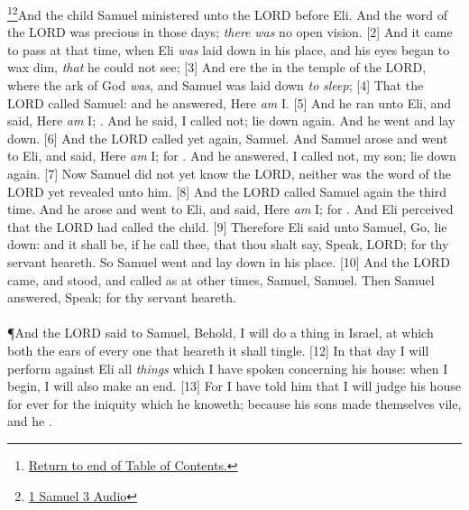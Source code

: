 \footnote{\textcolor[cmyk]{0.99998,1,0,0}{\hyperlink{TOC}{Return to end of Table of Contents.}}}\footnote{\href{https://audiobible.com/bible/1_samuel_3.html}{\textcolor[cmyk]{0.99998,1,0,0}{1 Samuel 3 Audio}}}\textcolor[cmyk]{0.99998,1,0,0}{And the child Samuel ministered unto the LORD before Eli. And the word of the LORD was precious in those days; \emph{there} \emph{was} no open vision.}
[2] \textcolor[cmyk]{0.99998,1,0,0}{And it came to pass at that time, when Eli \emph{was} laid down in his place, and his eyes began to wax dim, \emph{that} he could not see;}
[3] \textcolor[cmyk]{0.99998,1,0,0}{And ere the  in the temple of the LORD, where the ark of God \emph{was}, and Samuel was laid down \emph{to} \emph{sleep};}
[4] \textcolor[cmyk]{0.99998,1,0,0}{That the LORD called Samuel: and he answered, Here \emph{am} I.}
[5] \textcolor[cmyk]{0.99998,1,0,0}{And he ran unto Eli, and said, Here \emph{am} I; . And he said, I called not; lie down again. And he went and lay down.}
[6] \textcolor[cmyk]{0.99998,1,0,0}{And the LORD called yet again, Samuel. And Samuel arose and went to Eli, and said, Here \emph{am} I; for . And he answered, I called not, my son; lie down again.}
[7] \textcolor[cmyk]{0.99998,1,0,0}{Now Samuel did not yet know the LORD, neither was the word of the LORD yet revealed unto him.}
[8] \textcolor[cmyk]{0.99998,1,0,0}{And the LORD called Samuel again the third time. And he arose and went to Eli, and said, Here \emph{am} I; for . And Eli perceived that the LORD had called the child.}
[9] \textcolor[cmyk]{0.99998,1,0,0}{Therefore Eli said unto Samuel, Go, lie down: and it shall be, if he call thee, that thou shalt say, Speak, LORD; for thy servant heareth. So Samuel went and lay down in his place.}
[10] \textcolor[cmyk]{0.99998,1,0,0}{And the LORD came, and stood, and called as at other times, Samuel, Samuel. Then Samuel answered, Speak; for thy servant heareth.}\\
\\
\P \textcolor[cmyk]{0.99998,1,0,0}{And the LORD said to Samuel, Behold, I will do a thing in Israel, at which both the ears of every one that heareth it shall tingle.}
[12] \textcolor[cmyk]{0.99998,1,0,0}{In that day I will perform against Eli all \emph{things} which I have spoken concerning his house: when I begin, I will also make an end.}
[13] \textcolor[cmyk]{0.99998,1,0,0}{For I have told him that I will judge his house for ever for the iniquity which he knoweth; because his sons made themselves vile, and he  .}
